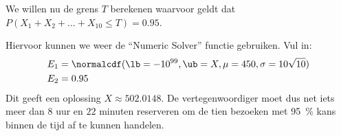 \begin{enumerate}[label=(\alph*)]
{        We willen nu de grens $T$ berekenen waarvoor geldt dat $P(X_1+X_2+\ldots+X_{10} \le T) = 0.95$.
        
        Hiervoor kunnen we weer de \enquote{Numeric Solver} functie gebruiken.
        Vul in:
        \begin{align*}
            E_1 &= \normalcdf(\lb=-10^{99}, \ub=X, \mu=450, \sigma=10\sqrt{10}) \\
            E_2 &= 0.95
        \end{align*}
        Dit geeft een oplossing $X \approx 502.0148$.
        De vertegenwoordiger moet dus net iets meer dan $8$ uur en $22$ minuten reserveren om de tien bezoeken met \SI{95}{\percent} kans binnen de tijd af te kunnen handelen.
    }
\end{enumerate}